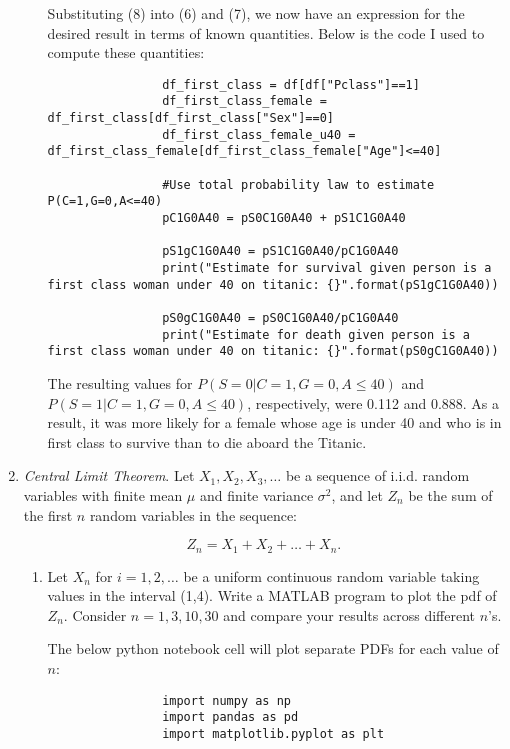 \documentclass[]{article}
\begin{document}
\begin{enumerate}
\begin{enumerate}
    		Substituting (8) into (6) and (7), we now have an expression for the desired result in terms of known quantities. Below is the code I used to compute these quantities:
    		
    		\begin{lstlisting}
    			df_first_class = df[df["Pclass"]==1]
    			df_first_class_female = df_first_class[df_first_class["Sex"]==0]
    			df_first_class_female_u40 = df_first_class_female[df_first_class_female["Age"]<=40]
    			
    			#Use total probability law to estimate P(C=1,G=0,A<=40)
    			pC1G0A40 = pS0C1G0A40 + pS1C1G0A40
    			
    			pS1gC1G0A40 = pS1C1G0A40/pC1G0A40
    			print("Estimate for survival given person is a first class woman under 40 on titanic: {}".format(pS1gC1G0A40))
    			
    			pS0gC1G0A40 = pS0C1G0A40/pC1G0A40
    			print("Estimate for death given person is a first class woman under 40 on titanic: {}".format(pS0gC1G0A40))
    		\end{lstlisting}
    	
    		The resulting values for $P(S= 0|C= 1,G= 0,A\leq40)$ and $P(S=1|C= 1,G= 0,A\leq40)$, respectively, were 0.112 and 0.888. As a result, it was more likely for a female whose age is under 40 and who is in first class to survive than to die aboard the Titanic.
    		
    	\end{enumerate}


	\pagebreak
	
	\item \textit{Central  Limit  Theorem}. Let $X_1, X_2, X_3, \ldots$  be  a  sequence  of  i.i.d.   random variables with finite mean $\mu$ and finite variance $\sigma^2$, and let $Z_n$ be the sum of the first $ n $ random variables in the sequence:
	
	\[
	Z_n=X_1+X_2+\ldots+X_n.
	\]
		
		\begin{enumerate}
			\item Let $X_n$ for $i=1,2,\ldots$ be a uniform continuous random variable taking values in the interval (1,4). Write a MATLAB program to plot the pdf of $Z_n$. Consider $n=1,3,10,30$ and compare your results across different $n$'s.
			
			The below python notebook cell will plot separate PDFs for each value of $n$:
			
			\begin{lstlisting}
				import numpy as np
				import pandas as pd
				import matplotlib.pyplot as plt
				

\end{lstlisting}
\end{enumerate}
\end{enumerate}
\end{document}
